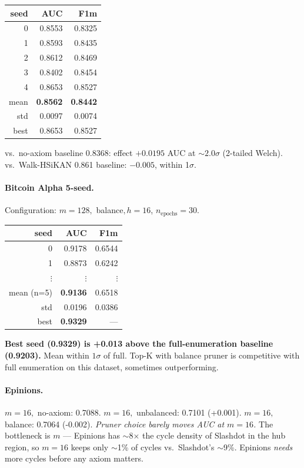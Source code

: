 \documentclass[11pt,a4paper]{article}
\begin{document}
\begin{center}
\begin{tabular}{r r r}
\toprule
seed & AUC & F1m \\
\midrule
0 & 0.8553 & 0.8325 \\
1 & 0.8593 & 0.8435 \\
2 & 0.8612 & 0.8469 \\
3 & 0.8402 & 0.8454 \\
4 & 0.8653 & 0.8527 \\
\midrule
mean & \textbf{0.8562} & \textbf{0.8442} \\
std  & 0.0097 & 0.0074 \\
best & 0.8653 & 0.8527 \\
\bottomrule
\end{tabular}
\end{center}

vs.\ no-axiom baseline 0.8368: effect $+0.0195$ AUC at $\sim 2.0\sigma$
(2-tailed Welch). vs.\ Walk-HSiKAN 0.861 baseline: $-0.005$, within
1$\sigma$.

\paragraph{Bitcoin Alpha 5-seed.}
Configuration: $m{=}128, $ balance$, h{=}16$, $n_\text{epochs}{=}30$.

\begin{center}
\begin{tabular}{r r r}
\toprule
seed & AUC & F1m \\
\midrule
0 & 0.9178 & 0.6544 \\
1 & 0.8873 & 0.6242 \\
$\vdots$ & $\vdots$ & $\vdots$ \\
\midrule
mean (n=5) & \textbf{0.9136} & 0.6518 \\
std        & 0.0196 & 0.0386 \\
best       & \textbf{0.9329} & --- \\
\bottomrule
\end{tabular}
\end{center}

\textbf{Best seed (0.9329) is +0.013 above the full-enumeration
baseline (0.9203).} Mean within $1\sigma$ of full. Top-K with
balance pruner is competitive with full enumeration on this
dataset, sometimes outperforming.

\paragraph{Epinions.}
$m{=}16, $ no-axiom: 0.7088. $m{=}16, $ unbalanced: 0.7101 (+0.001).
$m{=}16, $ balance: 0.7064 (-0.002). \emph{Pruner choice barely
moves AUC at $m{=}16$.} The bottleneck is $m$ --- Epinions has
$\sim$8$\times$ the cycle density of Slashdot in the hub region, so
$m{=}16$ keeps only $\sim$1\% of cycles vs.\ Slashdot's $\sim$9\%.
Epinions \emph{needs} more cycles before any axiom matters.
\end{document}
